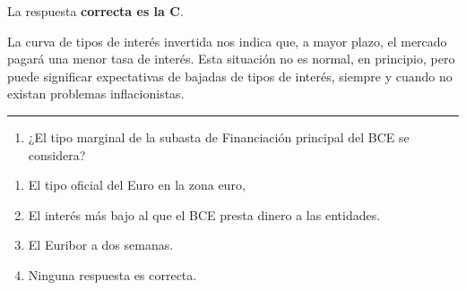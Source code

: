 \documentclass[
  letterpaper,
  DIV=11,
  numbers=noendperiod]{scrreprt}
\providecommand{\tightlist}{%
  \setlength{\itemsep}{0pt}\setlength{\parskip}{0pt}}\usepackage{longtable,booktabs,array}
\begin{document}
\begin{tcolorbox}[enhanced jigsaw, left=2mm, opacityback=0, colback=white, breakable, arc=.35mm, bottomrule=.15mm, rightrule=.15mm, toprule=.15mm, leftrule=.75mm, colframe=quarto-callout-tip-color-frame]
\begin{minipage}[t]{5.5mm}
\textcolor{quarto-callout-tip-color}{\faLightbulb}
\end{minipage}%
\begin{minipage}[t]{\textwidth - 5.5mm}

La respuesta \textbf{correcta es la C}.

La curva de tipos de interés invertida nos indica que, a mayor plazo, el
mercado pagará una menor tasa de interés. Esta situación no es normal,
en principio, pero puede significar expectativas de bajadas de tipos de
interés, siempre y cuando no existan problemas inflacionistas.

\end{minipage}%
\end{tcolorbox}

\begin{center}\rule{0.5\linewidth}{0.5pt}\end{center}

\begin{enumerate}
\def\labelenumi{\arabic{enumi}.}
\setcounter{enumi}{1}
\tightlist
\item
  ¿El tipo marginal de la subasta de Financiación principal del BCE se
  considera?
\end{enumerate}

\begin{enumerate}
\def\labelenumi{\alph{enumi})}
\item
  El tipo oficial del Euro en la zona euro,
\item
  El interés más bajo al que el BCE presta dinero a las entidades.
\item
  El Euribor a dos semanas.
\item
  Ninguna respuesta es correcta.
\end{enumerate}
\end{document}
